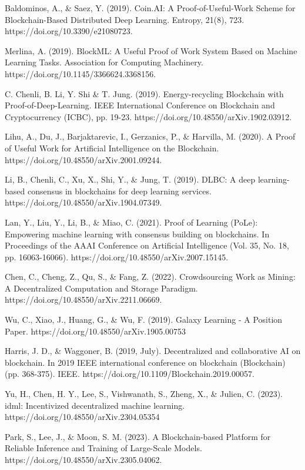 \documentclass[conference]{IEEEtran}
\begin{document}
\begin{thebibliography}{00}
 Baldominos, A., \& Saez, Y. (2019). Coin.AI: A Proof-of-Useful-Work Scheme for Blockchain-Based Distributed Deep Learning. Entropy, 21(8), 723. https://doi.org/10.3390/e21080723.

 Merlina, A. (2019). BlockML: A Useful Proof of Work System Based on Machine Learning Tasks. Association for Computing Machinery. https://doi.org/10.1145/3366624.3368156.

 C. Chenli, B. Li, Y. Shi \& T. Jung. (2019). Energy-recycling Blockchain with Proof-of-Deep-Learning. IEEE International Conference on Blockchain and Cryptocurrency (ICBC), pp. 19-23. https://doi.org/10.48550/arXiv.1902.03912.

 Lihu, A., Du, J., Barjaktarevic, I., Gerzanics, P., \& Harvilla, M. (2020). A Proof of Useful Work for Artificial Intelligence on the Blockchain. 
https://doi.org/10.48550/arXiv.2001.09244.

 Li, B., Chenli, C., Xu, X., Shi, Y., \& Jung, T. (2019). DLBC: A deep learning-based consensus in blockchains for deep learning services. 
https://doi.org/10.48550/arXiv.1904.07349.

 Lan, Y., Liu, Y., Li, B., \& Miao, C. (2021). Proof of Learning (PoLe): Empowering machine learning with consensus building on blockchains. In Proceedings of the AAAI Conference on Artificial Intelligence (Vol. 35, No. 18, pp. 16063-16066). 
https://doi.org/10.48550/arXiv.2007.15145.

 Chen, C., Cheng, Z., Qu, S., \& Fang, Z. (2022). Crowdsourcing Work as Mining: A Decentralized Computation and Storage Paradigm. 
https://doi.org/10.48550/arXiv.2211.06669.

 Wu, C., Xiao, J., Huang, G., \& Wu, F. (2019). Galaxy Learning - A Position Paper. 
https://doi.org/10.48550/arXiv.1905.00753

 Harris, J. D., \& Waggoner, B. (2019, July). Decentralized and collaborative AI on blockchain. In 2019 IEEE international conference on blockchain (Blockchain) (pp. 368-375). IEEE. https://doi.org/10.1109/Blockchain.2019.00057.

 Yu, H., Chen, H. Y., Lee, S., Vishwanath, S., Zheng, X., \& Julien, C. (2023). idml: Incentivized decentralized machine learning. 
https://doi.org/10.48550/arXiv.2304.05354

 Park, S., Lee, J., \& Moon, S. M. (2023). A Blockchain-based Platform for Reliable Inference and Training of Large-Scale Models. 
https://doi.org/10.48550/arXiv.2305.04062.

\end{thebibliography}
\end{document}
